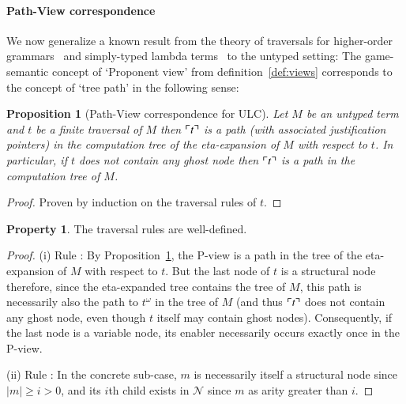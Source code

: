 \documentclass{elsarticle}
\theoremstyle{plain}
\newtheorem{proposition}[theorem]{Proposition}
\theoremstyle{definition}
\newtheorem{property}{Property}[section]
\theoremstyle{remark}
\newcommand\Nodes{\mathcal{N}}%
\begin{document}
\paragraph{Path-View correspondence}
We now generalize a known result from the theory of traversals for higher-order grammars~\cite{Ong2006} and simply-typed lambda terms~\cite[Proposition 4.29]{BlumPhd} to the untyped setting: The game-semantic concept of `Proponent view' from definition~\ref{def:views} corresponds to the concept of `tree path' in the following sense:

\begin{proposition}[Path-View correspondence for ULC]
\label{prop:pathview_ulc}
Let $M$ be an untyped term and $t$ be a \emph{finite} traversal of $M$ then
$\ulcorner t \urcorner$ is a path (with associated justification pointers) in the computation tree of the eta-expansion of $M$ with respect to $t$.
In particular, if $t$ does not contain any ghost node then $\ulcorner t \urcorner$ is a path in the computation tree of $M$.
\end{proposition}
\begin{proof}
Proven by induction on the traversal rules of $t$.
\end{proof}

\begin{property}
The traversal rules are well-defined.
\end{property}
\begin{proof}
(i) Rule : By Proposition~\ref{prop:pathview_ulc}, the P-view is a path in the tree of the eta-expansion of $M$ with respect to $t$. But the last node of $t$ is a structural node therefore, since the eta-expanded tree contains the tree of $M$, this path is necessarily also the path to $t^\omega$ in the tree of $M$ (and thus $\ulcorner t \urcorner$ does not contain any ghost node, even though $t$ itself may contain ghost nodes).
 Consequently, if the last node is a variable node, its enabler necessarily occurs exactly once in the P-view.

(ii) Rule : In the concrete sub-case, $m$ is necessarily itself a structural node since $|m|\geq i>0$, and its $i$th child exists in $\Nodes$ since $m$ as arity greater than $i$.
\end{proof}
\end{document}
